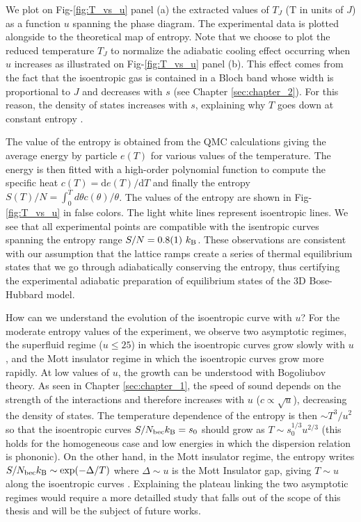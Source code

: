 We plot on Fig-\ref{fig:T_vs_u} panel (a) the extracted values of $T_J$ (T in units of $J$) as a function $u$ spanning the phase diagram. The experimental data is plotted alongside to the theoretical map of entropy. Note that we choose to plot the reduced temperature $T_J$ to normalize the adiabatic cooling effect occurring when $u$ increases as illustrated on Fig-\ref{fig:T_vs_u} panel (b). This effect comes from the fact that the isoentropic gas is contained in a Bloch band whose width is proportional to $J$ and decreases with $s$ (see Chapter \ref{sec:chapter_2}). For this reason, the density of states increases with $s$, explaining why $T$ goes down at constant entropy \cite{yoshimura2008adiabatic}.

The value of the entropy is obtained from the QMC calculations giving the average energy by particle $e(T)$ for various values of the temperature. The energy is then fitted with a high-order polynomial function to compute the specific heat $c(T)=\mathrm{d} e(T) / \mathrm{d} T$ and finally the entropy $S(T) / N=\int_{0}^{T} d \theta c(\theta) / \theta$. The values of the entropy are shown in Fig-\ref{fig:T_vs_u} in false colors. The light white lines represent isoentropic lines. We see that all experimental points are compatible with the isentropic curves spanning the entropy range $S/N= 0.8(1) \ k_{\mathrm{B}}$. These observations are consistent with our assumption that the lattice ramps create a series of thermal equilibrium states that we go through adiabatically conserving the entropy, thus certifying the experimental adiabatic preparation of equilibrium states of the 3D Bose-Hubbard model.

How can we understand the evolution of the isoentropic curve with $u$? For the moderate entropy values of the experiment, we observe two asymptotic regimes, the superfluid regime ($u \leq 25$) in which the isoentropic curves grow slowly with $u$, and the Mott insulator regime in which the isoentropic curves grow more rapidly. At low values of $u$, the growth can be understood with Bogoliubov theory. As seen in Chapter \ref{sec:chapter_1}, the speed of sound depends on the strength of the interactions and therefore increases with $u$ ($c \propto \sqrt{u}$), decreasing the density of states. The temperature dependence of the entropy is then $\sim T^3/u^2$ \cite{ho2007intrinsic} so that the isoentropic curves $S/N_{\rm{bec}} k_{\mathrm{B}} =s_0$ should grow as $T \sim s_{0}^{1 / 3} u^{2 / 3}$  (this holds for the homogeneous case and low energies in which the dispersion relation is phononic). On the other hand, in the Mott insulator regime, the entropy writes $S/N_{\rm{bec}} k_{\mathrm{B}} \sim \exp(-\Delta/T)$ where $\Delta \sim u$ is the Mott Insulator gap, giving $T \sim u$ along the isoentropic curves \cite{gerbier2007boson}. Explaining the plateau linking the two asymptotic regimes would require a more detailled study that falls out of the scope of this thesis and will be the subject of future works.


